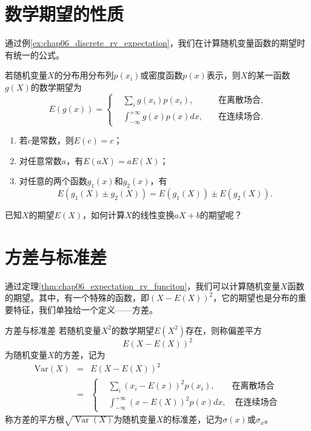 \section{数学期望的性质}
通过例\ref{ex:chap06_discrete_rv_expectation}，我们在计算随机变量函数的期望时有统一的公式。

\begin{theorem}\label{thm:chap06_expectation_rv_funciton}
若随机变量$X$的分布用分布列$p(x_i)$或密度函数$p(x)$表示，则$X$的某一函数$g(X)$的数学期望为
$$E(g(x))=\left\{\begin{aligned}
&\sum_{i} g\left(x_{i}\right) p\left(x_{i}\right), &\quad \text{在离散场合}, \\
&\int_{-\infty}^{+\infty} g(x) p(x) d x, &\quad \text{在连续场合}. 
\end{aligned}\right.$$
\end{theorem}

\begin{property}
\begin{enumerate}
\item 若$c$是常数，则$E(c) = c$；
 \item 对任意常数$a$，有$E(aX) = aE(X)$；
 \item 对任意的两个函数$g_1(x)$和$g_2(x)$，有
 $$ 
 E(g_1(X)\pm g_2(X)) = E(g_1(X)) \pm E(g_2(X)).
 $$
\end{enumerate}
\end{property}
\begin{note}
    \vspace{5cm}
\end{note}
\begin{problem}
    已知$X$的期望$E(X)$，如何计算$X$的线性变换$aX+b$的期望呢？
\end{problem}



\section{方差与标准差}
通过定理\ref{thm:chap06_expectation_rv_funciton}，我们可以计算随机变量$X$函数的期望。其中，有一个特殊的函数，即$(X-E(X))^2$，它的期望也是分布的重要特征，我们单独给一个定义——方差。

\begin{definition}{方差与标准差}\label{def:variance}
若随机变量$X^{2}$的数学期望$E(X^{2})$存在，则称偏差平方$$E(X-E(X))^{2}$$为随机变量$X$的方差，记为\begin{eqnarray*}
\text{Var}(X) &=&E(X-E(X))^{2}\\
&=& \left\{
\begin{aligned}
   & \sum_{i}\left(x_{i}-E(x)\right)^{2} p\left(x_{i}\right), \qquad \mbox{在离散场合}\\
   &\int_{-\infty}^{+\infty}(x-E(X))^{2} p(x) d x, \quad \mbox{在连续场合}
\end{aligned}
\right.
\end{eqnarray*}
称方差的平方根$\sqrt{\operatorname{Var}(X)}$为随机变量$X$的标准差，记为$\sigma(x)$或$\sigma_x$。
\end{definition}

